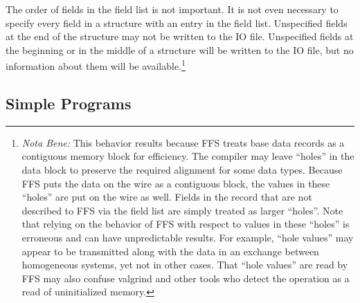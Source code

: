 The order of fields in the field list is not important.  It is not even
necessary to specify every field in a structure with an entry in the field
list. Unspecified fields at the end of the structure may not be written to
the IO file.  Unspecified fields at the beginning or in the middle of a
structure will be written to the IO file, but no information about them will
be available.\footnote{{\it Nota Bene:} This behavior results because FFS
  treats base data records 
  as a contiguous memory block for efficiency.  The compiler may leave
  ``holes'' in the data block to preserve the required alignment for some
  data types.  Because FFS puts the data on the wire as a contiguous block,
  the values in these ``holes'' are put on the wire as well.  Fields in the
  record that are not described to FFS via the field list are simply treated
  as larger ``holes''.  Note that relying on the behavior of FFS with
  respect to values in these ``holes'' is erroneous and can have
  unpredictable results.  For example, ``hole values'' may appear to be
  transmitted along with the data in an exchange between homogeneous
  systems, yet not in other cases.  That ``hole values'' are read by FFS may
  also confuse valgrind and other tools who detect the operation as a read
  of uninitialized memory.}

\subsection{Simple Programs}

